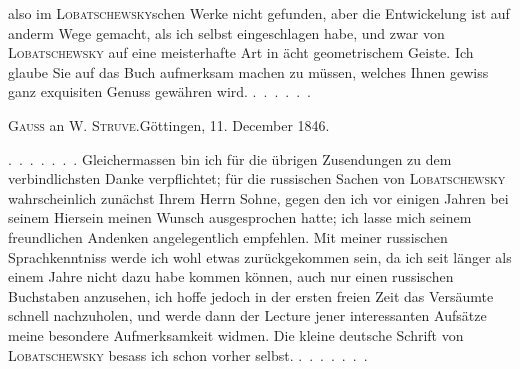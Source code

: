 %
also im \textsc{Lobatschewsky}schen Werke nicht gefunden, aber die Entwickelung
ist auf anderm Wege gemacht, als ich selbst eingeschlagen habe, und zwar von
\textsc{Lobatschewsky} auf eine meisterhafte Art in ächt geometrischem Geiste.
Ich glaube Sie auf das Buch aufmerksam machen zu müssen, welches Ihnen gewiss
ganz exquisiten Genuss gewähren wird. \mbox{.\ .\ .\ .\ .\ .}

\par\bigskip{}

\begin{center}
\textsc{Gauss} an W. \textsc{Struve}.\quad Göttingen, 11. December 1846.
\end{center}

\mbox{.\ .\ .\ .\ .\ .\ .} Gleichermassen bin ich für die übrigen Zusendungen zu dem
verbindlichsten Danke verpflichtet; für die russischen Sachen von
\textsc{Lobatschewsky} wahrscheinlich zunächst Ihrem Herrn Sohne, gegen den
ich vor einigen Jahren bei seinem Hiersein meinen Wunsch ausgesprochen hatte;
ich lasse mich seinem freundlichen Andenken angelegentlich empfehlen. Mit
meiner russischen Sprachkenntniss werde ich wohl etwas zurückgekommen sein,
da ich seit länger als einem Jahre nicht dazu habe kommen können, auch nur
einen russischen Buchstaben anzusehen, ich hoffe jedoch in der ersten freien
Zeit das Versäumte schnell nachzuholen, und werde dann der Lecture jener
interessanten Aufsätze meine besondere Aufmerksamkeit widmen. Die kleine
deutsche Schrift von \textsc{Lobatschewsky} besass ich schon vorher
selbst. \mbox{.\ .\ .\ .\ .\ .\ .}


